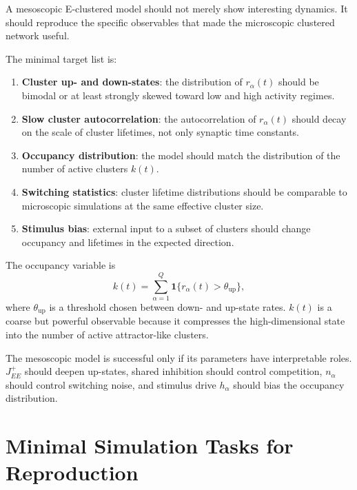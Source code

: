 A mesoscopic E-clustered model should not merely show interesting dynamics. It should reproduce the specific observables that made the microscopic clustered network useful.

The minimal target list is:
%
\begin{enumerate}[leftmargin=*]
  \item \textbf{Cluster up- and down-states}: the distribution of $r_{\alpha}(t)$ should be bimodal or at least strongly skewed toward low and high activity regimes.
  \item \textbf{Slow cluster autocorrelation}: the autocorrelation of $r_{\alpha}(t)$ should decay on the scale of cluster lifetimes, not only synaptic time constants.
  \item \textbf{Occupancy distribution}: the model should match the distribution of the number of active clusters $k(t)$.
  \item \textbf{Switching statistics}: cluster lifetime distributions should be comparable to microscopic simulations at the same effective cluster size.
  \item \textbf{Stimulus bias}: external input to a subset of clusters should change occupancy and lifetimes in the expected direction.
\end{enumerate}

The occupancy variable is
%
\begin{equation}
  k(t)
  =
  \sum_{\alpha=1}^{Q}
  \mathbf{1}\{r_{\alpha}(t)>\theta_{\mathrm{up}}\},
  \label{eq:occupancy-variable}
\end{equation}
%
where $\theta_{\mathrm{up}}$ is a threshold chosen between down- and up-state rates. $k(t)$ is a coarse but powerful observable because it compresses the high-dimensional state into the number of active attractor-like clusters.

The mesoscopic model is successful only if its parameters have interpretable roles. $J_{EE}^{+}$ should deepen up-states, shared inhibition should control competition, $n_{\alpha}$ should control switching noise, and stimulus drive $h_{\alpha}$ should bias the occupancy distribution.

\section{Minimal Simulation Tasks for Reproduction}
\label{sec:minimal-simulation-tasks-reproduction}


